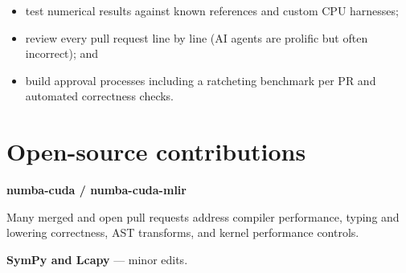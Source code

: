 \documentclass[11pt,a4paper]{article}
\begin{document}
\begin{itemize}
  \item test numerical results against known references and custom CPU harnesses;
  \item review every pull request line by line (AI agents are prolific but often incorrect); and
  \item build approval processes including a ratcheting benchmark per PR and automated correctness checks.
\end{itemize}

\section{Open-source contributions}
\textbf{numba-cuda / numba-cuda-mlir}\par
Many merged and open pull requests address compiler performance, typing and
lowering correctness, AST transforms, and kernel performance controls.

\textbf{SymPy and Lcapy} --- minor edits.
\end{document}
